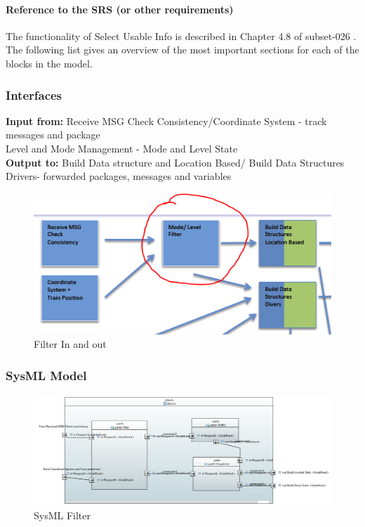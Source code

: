 \documentclass{template/openetcs_report}
\begin{document}
\paragraph{Reference to the SRS (or other requirements)}
The functionality of Select Usable Info is described in Chapter 4.8 of subset-026 \cite{subset-026}. The following list gives an overview of the most important sections for each of the blocks in the model.

\subsubsection{Interfaces}

\textbf{Input from:} Receive MSG Check Consistency/Coordinate System - track messages and package\\
Level and Mode Management - Mode and Level State\\

\textbf{Output to:} Build Data structure and Location Based/ Build Data Structures Drivers- forwarded packages, messages and variables\\

\begin{figure}[hbtp]
\centering
\includegraphics[scale=0.7]{images/FilterInandOUt}
\caption{Filter In and out}
\end{figure}

\subsubsection{SysML Model}
\begin{figure}[hbtp]
\centering
\includegraphics [scale=0.5]{images/SysMLFilter}
\caption{SysML Filter}
\end{figure}
\end{document}
